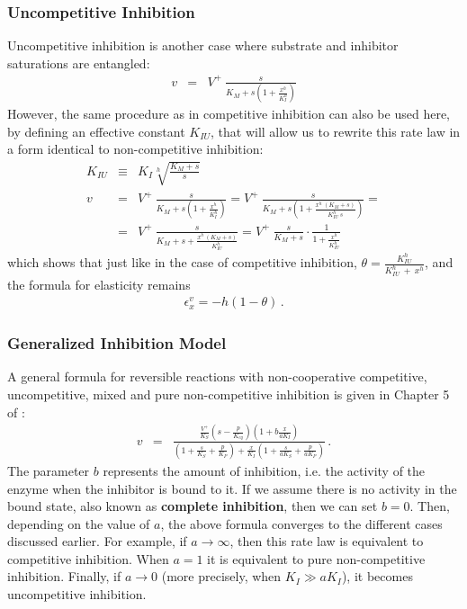 \documentclass[12pt,a4paper]{article}
\begin{document}
\subsubsection{Uncompetitive Inhibition}
Uncompetitive inhibition is another case where substrate and inhibitor saturations are entangled:
\begin{eqnarray}
    v &=& V^+ ~ \frac{s}{K_M + s \left(1 + \frac{x^h}{K_I^h}\right)}
\end{eqnarray}
However, the same procedure as in competitive inhibition can also be used here, by defining an effective constant $K_{IU}$, that will allow us to rewrite this rate law in a form identical to non-competitive inhibition:
\begin{eqnarray}
    K_{IU} &\equiv& K_I \sqrt[h]{\frac{K_M + s}{s}} \nonumber\\
    v &=& V^+ ~ \frac{s}{K_M + s \left(1 + \frac{x^h}{K_I^h}\right)} =
          V^+ ~ \frac{s}{K_M + s \left(1 + \frac{x^h~(K_M + s)}{K_{IU}^h~s}\right)} = \nonumber\\
      &=& V^+ ~ \frac{s}{K_M + s + \frac{x^h~(K_M + s)}{K_{IU}^h}} = 
          V^+ ~ \frac{s}{K_M + s} \cdot \frac{1}{1 + \frac{x^h}{K_{IU}^h}}
\end{eqnarray}
which shows that just like in the case of competitive inhibition, $\theta = \frac{K_{IU}^h}{K_{IU}^h~+~x^h}$, and the formula for elasticity remains
\begin{eqnarray}
    \epsilon_x^v = -h(1 - \theta)\,. \label{eq:eps_uncomp_inh}
\end{eqnarray}

\subsubsection{Generalized Inhibition Model}
A general formula for reversible reactions with non-cooperative competitive, uncompetitive, mixed and pure non-competitive inhibition is given in Chapter 5 of \citet{Sauro2011-op}:
\begin{eqnarray}\label{eq:gen_inh_model}
    v &=& \frac{\frac{V^+}{K_S}\left(s - \frac{p}{K_{eq}}\right)\left(1 + b \frac{x}{aK_I}\right)}{\left(1 + \frac{s}{K_S} + \frac{p}{K_P}\right) + \frac{x}{K_I} \left(1 + \frac{s}{aK_S} + \frac{p}{aK_P}\right)}\,.
\end{eqnarray}
The parameter $b$ represents the amount of inhibition, i.e. the activity of the enzyme when the inhibitor is bound to it. If we assume there is no activity in the bound state, also known as \textbf{complete inhibition}, then we can set $b = 0$. 
Then, depending on the value of $a$, the above formula converges to the different cases discussed earlier. For example, if $a \rightarrow \infty$, then this rate law is equivalent to competitive inhibition. When $a = 1$ it is equivalent to pure non-competitive inhibition. Finally, if $a \rightarrow 0$ (more precisely, when $K_I \gg a K_I$), it becomes uncompetitive inhibition.
\end{document}
